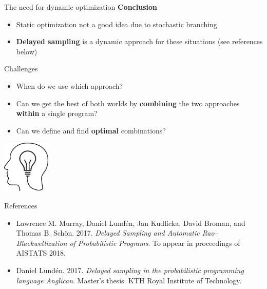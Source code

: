 \documentclass[t]{beamer}
\newlength{\cheight}
\begin{document}
\begin{frame}[fragile]{}
\begin{minipage}[c][\cheight][t]{0.48\linewidth}
\begin{block}{The need for dynamic optimization}
    \textbf{Conclusion}
    \begin{itemize}
      \item Static optimization not a good idea due to stochastic branching
        \vspace{5mm}
      \item \textbf{Delayed sampling} is a dynamic approach for these
        situations (see references below)
    \end{itemize}
  \end{block}
  \vfill

  \begin{block}{Challenges}
    \begin{itemize}
      \item When do we use which approach?

      \item
        \vspace{1cm}
        Can we get the best of both worlds by \textbf{combining} the two
        approaches \textbf{within} a single program?

      \item
        \vspace{1cm}
        Can we define and find \textbf{optimal} combinations?
    \end{itemize}

    \vspace{1cm}
    \begin{center}
      \includegraphics[width=0.17\textwidth]{img/challenges}
    \end{center}
  \end{block}

  \vfill

  \begin{block}{References}
    \begin{itemize}
      \item
        Lawrence M. Murray, Daniel Lundén, Jan Kudlicka, David Broman, and
        Thomas B. Schön. 2017. \emph{Delayed Sampling and Automatic
        Rao--Blackwellization of Probabilistic Programs}. To appear in
        proceedings of AISTATS 2018.

      \item
        \vspace{1cm}
        Daniel Lundén. 2017. \emph{Delayed sampling in the
        probabilistic programming language Anglican}. Master's thesis. KTH
        Royal Institute of Technology.
    \end{itemize}
  \end{block}

\end{minipage}
\end{frame}
\end{document}
